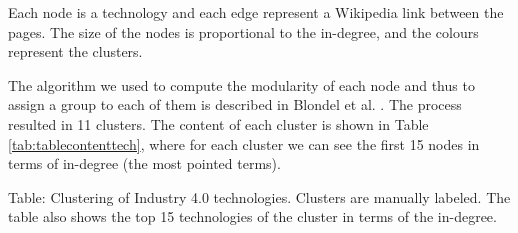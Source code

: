 \documentclass[]{book}
\begin{document}
Each node is a technology and each edge represent a Wikipedia link
between the pages. The size of the nodes is proportional to the
in-degree, and the colours represent the clusters.

The algorithm we used to compute the modularity of each node and thus to
assign a group to each of them is described in Blondel et al.
\citep{blondel2008fast}. The process resulted in 11 clusters. The
content of each cluster is shown in Table \ref{tab:tablecontenttech},
where for each cluster we can see the first 15 nodes in terms of
in-degree (the most pointed terms).

Table: \label{tab:tablecontenttech} Clustering of Industry 4.0 technologies.
Clusters are manually labeled. The table also shows the top 15
technologies of the cluster in terms of the in-degree.
\end{document}
